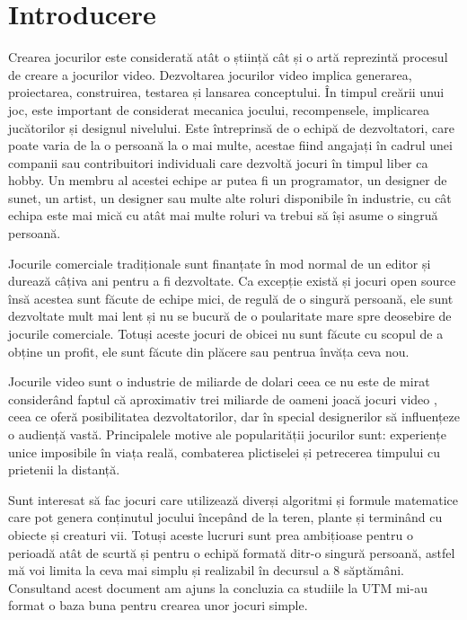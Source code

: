 \clearpage
\section*{Introducere}

Crearea jocurilor este considerată atât o știință cât și o artă reprezintă
procesul de creare a jocurilor video. Dezvoltarea jocurilor video implica
generarea, proiectarea, construirea, testarea și lansarea conceptului. În
timpul creării unui joc, este important de considerat mecanica jocului,
recompensele, implicarea jucătorilor și designul nivelului. Este întreprinsă de
o echipă de dezvoltatori, care poate varia de la o persoană la o mai multe,
acestae fiind angajați în cadrul unei companii sau contribuitori individuali
care dezvoltă jocuri în timpul liber ca hobby. Un membru al acestei echipe ar
putea fi un programator, un designer de sunet, un artist, un designer sau multe
alte roluri disponibile în industrie, cu cât echipa este mai mică cu atât mai
multe roluri va trebui să își asume o singruă persoană.

Jocurile comerciale tradiționale sunt finanțate în mod normal de un editor și
durează câțiva ani pentru a fi dezvoltate. Ca excepție există și jocuri open
source însă acestea sunt făcute de echipe mici, de regulă de o singură
persoană, ele sunt dezvoltate mult mai lent și nu se bucură de o poularitate
mare spre deosebire de jocurile comerciale. Totuși aceste jocuri de obicei nu
sunt făcute cu scopul de a obține un profit, ele sunt făcute din plăcere
sau pentrua învăța ceva nou.

Jocurile video sunt o industrie de miliarde de dolari ceea ce nu este de
mirat considerând faptul că aproximativ trei miliarde de oameni joacă jocuri
video \cite{GamersStatistic}, ceea ce oferă posibilitatea dezvoltatorilor, dar
în special designerilor să influențeze o audiență
vastă. 
Principalele motive ale popularității jocurilor sunt: experiențe unice imposibile în viața reală, combaterea plictiselei și petrecerea timpului cu prietenii la distanță.

Sunt interesat să fac jocuri care utilizează diverși algoritmi și formule
matematice care pot genera conținutul jocului începând de la teren, plante și
terminând cu obiecte și creaturi vii. Totuși aceste lucruri sunt prea
ambițioase pentru o perioadă atât de scurtă și pentru o echipă formată ditr-o
singură persoană, astfel mă voi limita la ceva mai simplu și realizabil în
decursul a 8 săptămâni.
Consultand acest document am ajuns la concluzia ca studiile la UTM mi-au
format o baza buna pentru crearea unor jocuri simple. \cite{GameDevRoadmap}



